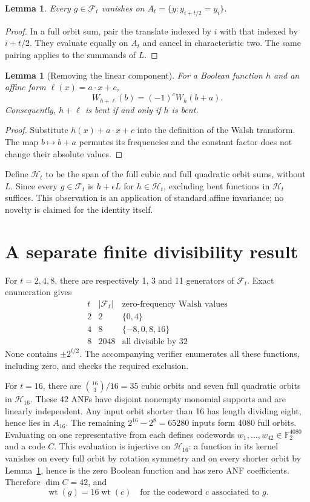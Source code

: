 \documentclass[11pt,a4paper]{article}
\newtheorem{lemma}[theorem]{Lemma}
\newcommand{\F}{\mathbb F_2}
\newcommand{\wt}{\operatorname{wt}}
\begin{document}
\begin{lemma}\label{lem:vanishing}
Every $g\in\mathcal F_t$ vanishes on $A_t=\{y:y_{i+t/2}=y_i\}$.
\end{lemma}
\begin{proof}
In a full orbit sum, pair the translate indexed by $i$ with that indexed by $i+t/2$. They evaluate equally on $A_t$ and cancel in characteristic two. The same pairing applies to the summands of $L$.
\end{proof}


\begin{lemma}[Removing the linear component]\label{lem:linear}
For a Boolean function $h$ and an affine form $\ell(x)=a\cdot x+c$,
\[W_{h+\ell}(b)=(-1)^c W_h(b+a).\]
Consequently, $h+\ell$ is bent if and only if $h$ is bent.
\end{lemma}
\begin{proof}
Substitute $h(x)+a\cdot x+c$ into the definition of the Walsh transform.
The map $b\mapsto b+a$ permutes its frequencies and the constant factor
does not change their absolute values.
\end{proof}
Define $\mathcal H_t$ to be the span of the full cubic and full quadratic
orbit sums, without $L$. Since every $g\in\mathcal F_t$ is $h+\epsilon L$
for $h\in\mathcal H_t$, excluding bent functions in $\mathcal H_t$ suffices.
This observation is an application of standard affine invariance; no
novelty is claimed for the identity itself.

\section{A separate finite divisibility result}
For $t=2,4,8$, there are respectively 1, 3 and 11 generators of $\mathcal F_t$. Exact enumeration gives
\[
\begin{array}{c|c|c}
t & |\mathcal F_t| & \text{zero-frequency Walsh values}\\\hline
2&2&\{0,4\}\\
4&8&\{-8,0,8,16\}\\
8&2048&\text{all divisible by }32
\end{array}
\]
None contains $\pm2^{t/2}$. The accompanying verifier enumerates all these functions, including zero, and checks the required exclusion.

For $t=16$, there are $\binom{16}{3}/16=35$ cubic orbits and seven full quadratic orbits in $\mathcal H_{16}$. These 42 ANFs have disjoint nonempty monomial supports and are linearly independent. Any input orbit shorter than 16 has length dividing eight, hence lies in $A_{16}$. The remaining $2^{16}-2^8=65280$ inputs form 4080 full orbits. Evaluating on one representative from each defines codewords $w_1,\ldots,w_{42}\in\F^{4080}$ and a code $C$. This evaluation is injective on $\mathcal H_{16}$: a function in its kernel vanishes on every full orbit by rotation symmetry and on every shorter orbit by Lemma~\ref{lem:vanishing}, hence is the zero Boolean function and has zero ANF coefficients. Therefore $\dim C=42$, and
\begin{equation}\label{eq:weights}
\wt(g)=16\wt(c)\quad\text{for the codeword }c\text{ associated to }g.
\end{equation}
\end{document}
